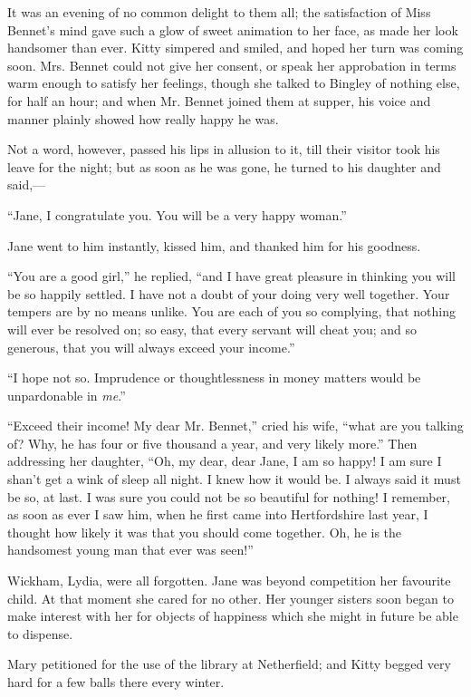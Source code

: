 \documentclass[12pt]{book}
\begin{document}
It was an evening of no common delight to them all; the satisfaction of Miss Bennet's mind gave such a glow of sweet animation to her face, as made her look handsomer than ever. Kitty simpered and smiled, and hoped her turn was coming soon. Mrs. Bennet could not give her consent, or speak her approbation in terms warm enough to satisfy her feelings, though she talked to Bingley of nothing else, for half an hour; and when Mr. Bennet joined them at supper, his voice and manner plainly showed how really happy he was.

Not a word, however, passed his lips in allusion to it, till their visitor took his leave for the night; but as soon as he was gone, he turned to his daughter and said,---

``Jane, I congratulate you. You will be a very happy woman.''

Jane went to him instantly, kissed him, and thanked him for his goodness.

``You are a good girl,'' he replied, ``and I have great pleasure in thinking you will be so happily settled. I have not a doubt of your doing very well together. Your tempers are by no means unlike. You are each of you so complying, that nothing will ever be resolved on; so easy, that every servant will cheat you; and so generous, that you will always exceed your income.''

``I hope not so. Imprudence or thoughtlessness in money matters would be unpardonable in \textit{me}.''

``Exceed their income! My dear Mr. Bennet,'' cried his wife, ``what are you talking of? Why, he has four or five thousand a year, and very likely more.'' Then addressing her daughter, ``Oh, my dear, dear Jane, I am so happy! I am sure I shan't get a wink of sleep all night. I knew how it would be. I always said it must be so, at last. I was sure you could not be so beautiful for nothing! I remember, as soon as ever I saw him, when he first came into Hertfordshire last year, I thought how likely it was that you should come together. Oh, he is the handsomest young man that ever was seen!''

Wickham, Lydia, were all forgotten. Jane was beyond competition her favourite child. At that moment she cared for no other. Her younger sisters soon began to make interest with her for objects of happiness which she might in future be able to dispense.

Mary petitioned for the use of the library at Netherfield; and Kitty begged very hard for a few balls there every winter.
\end{document}
